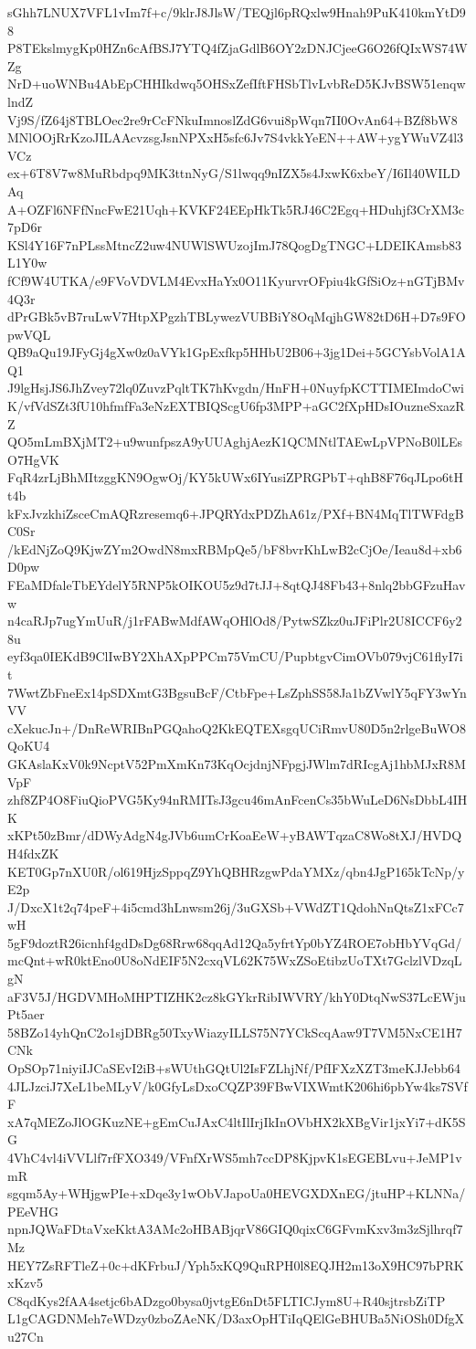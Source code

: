 sGhh7LNUX7VFL1vIm7f+c/9klrJ8JlsW/TEQjl6pRQxlw9Hnah9PuK410kmYtD98
P8TEkslmygKp0HZn6cAfBSJ7YTQ4fZjaGdlB6OY2zDNJCjeeG6O26fQIxWS74WZg
NrD+uoWNBu4AbEpCHHIkdwq5OHSxZefIftFHSbTlvLvbReD5KJvBSW51enqwlndZ
Vj9S/fZ64j8TBLOec2re9rCcFNkuImnoslZdG6vui8pWqn7II0OvAn64+BZf8bW8
MNlOOjRrKzoJILAAcvzsgJsnNPXxH5sfc6Jv7S4vkkYeEN++AW+ygYWuVZ4l3VCz
ex+6T8V7w8MuRbdpq9MK3ttnNyG/S1lwqq9nIZX5s4JxwK6xbeY/I6Il40WILDAq
A+OZFl6NFfNncFwE21Uqh+KVKF24EEpHkTk5RJ46C2Egq+HDuhjf3CrXM3c7pD6r
KSl4Y16F7nPLssMtncZ2uw4NUWlSWUzojImJ78QogDgTNGC+LDEIKAmsb83L1Y0w
fCf9W4UTKA/e9FVoVDVLM4EvxHaYx0O11KyurvrOFpiu4kGfSiOz+nGTjBMv4Q3r
dPrGBk5vB7ruLwV7HtpXPgzhTBLywezVUBBiY8OqMqjhGW82tD6H+D7s9FOpwVQL
QB9aQu19JFyGj4gXw0z0aVYk1GpExfkp5HHbU2B06+3jg1Dei+5GCYsbVolA1AQ1
J9lgHsjJS6JhZvey72lq0ZuvzPqltTK7hKvgdn/HnFH+0NuyfpKCTTIMEImdoCwi
K/vfVdSZt3fU10hfmfFa3eNzEXTBIQScgU6fp3MPP+aGC2fXpHDsIOuzneSxazRZ
QO5mLmBXjMT2+u9wunfpszA9yUUAghjAezK1QCMNtlTAEwLpVPNoB0lLEsO7HgVK
FqR4zrLjBhMItzggKN9OgwOj/KY5kUWx6IYusiZPRGPbT+qhB8F76qJLpo6tHt4b
kFxJvzkhiZsceCmAQRzresemq6+JPQRYdxPDZhA61z/PXf+BN4MqTlTWFdgBC0Sr
/kEdNjZoQ9KjwZYm2OwdN8mxRBMpQe5/bF8bvrKhLwB2cCjOe/Ieau8d+xb6D0pw
FEaMDfaleTbEYdelY5RNP5kOIKOU5z9d7tJJ+8qtQJ48Fb43+8nlq2bbGFzuHavw
n4caRJp7ugYmUuR/j1rFABwMdfAWqOHlOd8/PytwSZkz0uJFiPlr2U8ICCF6y28u
eyf3qa0IEKdB9ClIwBY2XhAXpPPCm75VmCU/PupbtgvCimOVb079vjC61flyI7it
7WwtZbFneEx14pSDXmtG3BgsuBcF/CtbFpe+LsZphSS58Ja1bZVwlY5qFY3wYnVV
cXekucJn+/DnReWRIBnPGQahoQ2KkEQTEXsgqUCiRmvU80D5n2rlgeBuWO8QoKU4
GKAslaKxV0k9NcptV52PmXmKn73KqOcjdnjNFpgjJWlm7dRIcgAj1hbMJxR8MVpF
zhf8ZP4O8FiuQioPVG5Ky94nRMITsJ3gcu46mAnFcenCs35bWuLeD6NsDbbL4IHK
xKPt50zBmr/dDWyAdgN4gJVb6umCrKoaEeW+yBAWTqzaC8Wo8tXJ/HVDQH4fdxZK
KET0Gp7nXU0R/ol619HjzSppqZ9YhQBHRzgwPdaYMXz/qbn4JgP165kTcNp/yE2p
J/DxcX1t2q74peF+4i5cmd3hLnwsm26j/3uGXSb+VWdZT1QdohNnQtsZ1xFCc7wH
5gF9doztR26icnhf4gdDsDg68Rrw68qqAd12Qa5yfrtYp0bYZ4ROE7obHbYVqGd/
mcQnt+wR0ktEno0U8oNdEIF5N2cxqVL62K75WxZSoEtibzUoTXt7GclzlVDzqLgN
aF3V5J/HGDVMHoMHPTIZHK2cz8kGYkrRibIWVRY/khY0DtqNwS37LcEWjuPt5aer
58BZo14yhQnC2o1sjDBRg50TxyWiazyILLS75N7YCkScqAaw9T7VM5NxCE1H7CNk
OpSOp71niyiIJCaSEvI2iB+sWUthGQtUl2IsFZLhjNf/PfIFXzXZT3meKJJebb64
4JLJzciJ7XeL1beMLyV/k0GfyLsDxoCQZP39FBwVIXWmtK206hi6pbYw4ks7SVfF
xA7qMEZoJlOGKuzNE+gEmCuJAxC4ltIlIrjIkInOVbHX2kXBgVir1jxYi7+dK5SG
4VhC4vl4iVVLlf7rfFXO349/VFnfXrWS5mh7ccDP8KjpvK1sEGEBLvu+JeMP1vmR
sgqm5Ay+WHjgwPIe+xDqe3y1wObVJapoUa0HEVGXDXnEG/jtuHP+KLNNa/PEeVHG
npnJQWaFDtaVxeKktA3AMc2oHBABjqrV86GIQ0qixC6GFvmKxv3m3zSjlhrqf7Mz
HEY7ZsRFTleZ+0c+dKFrbuJ/Yph5xKQ9QuRPH0l8EQJH2m13oX9HC97bPRKxKzv5
C8qdKys2fAA4setjc6bADzgo0bysa0jvtgE6nDt5FLTICJym8U+R40sjtrsbZiTP
L1gCAGDNMeh7eWDzy0zboZAeNK/D3axOpHTiIqQElGeBHUBa5NiOSh0DfgXu27Cn
